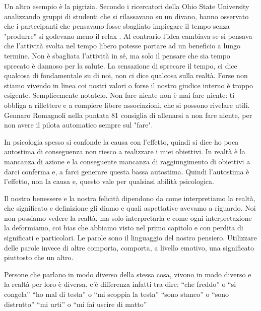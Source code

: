 \documentclass[12pt]{book} %
\begin{document}
\begin{mdframed}[linewidth=1pt]
Un altro esempio è la pigrizia. Secondo i ricercatori della Ohio State University analizzando gruppi di studenti che si
rilassavano su un divano, hanno osservato che i partecipanti che pensavano fosse sbagliato impiegare il tempo senza
"produrre" si godevano meno il relax . Al contrario l'idea cambiava se
si pensava che l'attività svolta nel tempo libero potesse portare ad un beneficio a lungo termine. Non è sbagliata
l'attività in sé, ma solo il pensare che sia tempo sprecato è dannoso per la salute. La sensazione
di sprecare il tempo, ci dice qualcosa di fondamentale su di noi, non ci dice qualcosa sulla realtà. Forse non stiamo
vivendo in linea coi nostri valori o forse il nostro giudice interno è troppo esigente. Semplicemente notatelo. Non
fare niente non è mai fare niente: ti obbliga a riflettere e a compiere libere associazioni, che si possono rivelare
utili. Gennaro Romagnoli nella puntata 81 consiglia di allenarsi a non fare niente, per non avere il pilota automatico sempre sul "fare".
\end{mdframed}

In psicologia spesso si confonde la causa con l'effetto, quindi si dice ho poca autostima di conseguenza non riesco a realizzare i miei obiettivi. In realtà è la mancanza di azione e la conseguente mancanza di raggiungimento di obiettivi a darci conferma e, a farci generare questa bassa autostima. Quindi l'autostima è l'effetto, non la causa e, questo vale per qualsiasi abilità psicologica.

Il nostro benessere e la nostra felicità dipendono da come interpretiamo la realtà, che significato e definizione gli
diamo e quali aspettative avevamo a riguardo. Noi non possiamo vedere la realtà, ma solo interpretarla e come ogni
interpretazione la deformiamo, coi bias che abbiamo visto nel primo capitolo e con perdita di significati e
particolari. Le parole sono il linguaggio del nostro pensiero. Utilizzare delle parole invece di altre comporta,
comporta, a livello emotivo, una significato piuttosto che un altro.

Persone che parlano in modo diverso della stessa cosa, vivono in modo diverso e la realtà per loro è diversa. c'è
differenza infatti tra dire:\newline
“che freddo” o “si congela”\newline
“ho mal di testa” o “mi scoppia la testa”\newline
“sono stanco” o “sono distrutto”\newline
“mi urti” o “mi fai uscire di matto”
\end{document}
